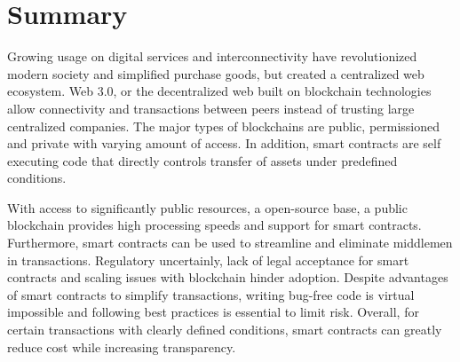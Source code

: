   \section*{Summary } 
  Growing usage on digital services and interconnectivity have revolutionized modern society and simplified purchase goods, but created a centralized web ecosystem.
  Web 3.0, or the decentralized web built on blockchain technologies allow connectivity and transactions between peers instead of trusting large centralized companies. 
  The major types of blockchains are public, permissioned and private with varying amount of access. In addition, smart contracts are self executing code that directly controls transfer of assets under predefined conditions. 
  
  With access to significantly public resources, a open-source base, a public blockchain provides high processing speeds and support for smart contracts. Furthermore, smart contracts can be used to streamline and eliminate middlemen in transactions.
  Regulatory uncertainly, lack of legal acceptance for smart contracts and scaling issues with blockchain hinder adoption. Despite advantages of smart contracts to simplify transactions, writing bug-free code is virtual impossible and following best practices is essential to limit risk.  Overall, for certain transactions with clearly defined conditions, smart contracts can greatly reduce cost while increasing transparency.
  
  
